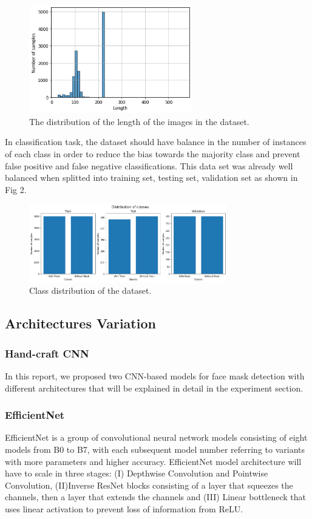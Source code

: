 \documentclass[conference]{IEEEtran}
\begin{document}
\begin{figure}[ht!] %
\centering
\includegraphics[width=2.8in]{size.png}
\caption{ The distribution of the length of the images in the dataset.}
\label{bench}
\end{figure}

In classification task, the dataset should have balance in the number of instances of each class in order to reduce the bias towards the majority class and prevent false positive and false negative classifications. This data set was already well balanced when splitted into training set, testing set, validation set as shown in Fig 2.

\begin{figure}[ht!] %
\centering
\includegraphics[width=3.4in]{distribution.png}
\caption{ Class distribution of the dataset.}
\label{bench}
\end{figure}


\subsection{Architectures Variation}

\subsubsection{Hand-craft CNN}
In this report, we proposed two CNN-based models for face mask detection with different architectures that will be explained in detail in the experiment section.

\subsubsection{EfficientNet}
EfficientNet is a group of convolutional neural network models consisting of eight models from B0 to B7, with each subsequent model number referring to variants with more parameters and higher accuracy. EfficientNet model architecture will have to scale in three stages: (I) Depthwise Convolution and Pointwise Convolution, (II)Inverse ResNet blocks consisting of a layer that squeezes the channels, then a layer that extends the channels and (III) Linear bottleneck that uses linear activation to prevent loss of information from ReLU.\cite{DBLP:journals/corr/abs-1905-11946}
\end{document}
